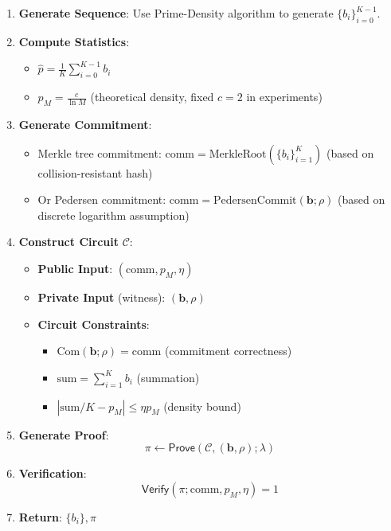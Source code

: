 \documentclass[12pt]{article}
\theoremstyle{plain}
\theoremstyle{definition}
\begin{document}
\begin{enumerate}
\item \textbf{Generate Sequence}: Use Prime-Density algorithm to generate $\{b_i\}_{i=0}^{K-1}$.

\item \textbf{Compute Statistics}:
\begin{itemize}
   \item $\hat{p} = \frac{1}{K} \sum_{i=0}^{K-1} b_i$
   \item $p_M = \frac{c}{\ln M}$ (theoretical density, fixed $c=2$ in experiments)
\end{itemize}

\item \textbf{Generate Commitment}:
\begin{itemize}
   \item Merkle tree commitment: $\text{comm} = \text{MerkleRoot}(\{b_i\}_{i=1}^K)$ (based on collision-resistant hash)
   \item Or Pedersen commitment: $\text{comm} = \text{PedersenCommit}(\mathbf{b}; \rho)$ (based on discrete logarithm assumption)
\end{itemize}

\item \textbf{Construct Circuit} $\mathcal{C}$:
\begin{itemize}
   \item \textbf{Public Input}: $(\text{comm}, p_M, \eta)$
   \item \textbf{Private Input} (witness): $(\mathbf{b}, \rho)$
   \item \textbf{Circuit Constraints}:
   \begin{itemize}
     \item $\text{Com}(\mathbf{b}; \rho) = \text{comm}$ (commitment correctness)
     \item $\text{sum} = \sum_{i=1}^K b_i$ (summation)
     \item $|\text{sum}/K - p_M| \le \eta p_M$ (density bound)
   \end{itemize}
\end{itemize}

\item \textbf{Generate Proof}:
   \[
   \pi \leftarrow \mathsf{Prove}(\mathcal{C}, (\mathbf{b}, \rho); \lambda)
   \]

\item \textbf{Verification}:
   \[
   \mathsf{Verify}(\pi; \text{comm}, p_M, \eta) = 1
   \]

\item \textbf{Return}: $\{b_i\}, \pi$
\end{enumerate}
\end{document}
